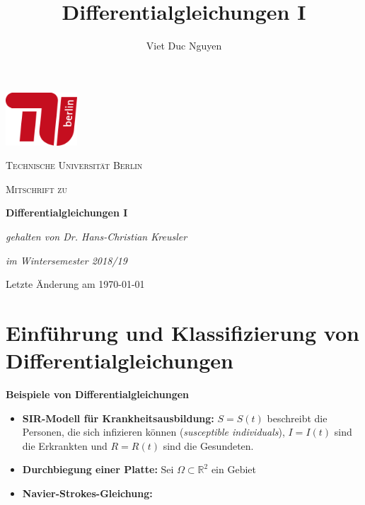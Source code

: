 \documentclass[a4paper]{book}
\theoremstyle{plain}
\theoremstyle{definition}
\begin{document}
\title{Differentialgleichungen I}
\author{Viet Duc Nguyen}


\begin{titlepage}
	\centering
	\includegraphics[width=0.2\textwidth]{tub_logo.png}\par\vspace{1cm}
	{\scshape\LARGE Technische Universit\"at Berlin \par}
	\vspace{1cm}
	{\scshape\Large Mitschrift zu \par}
	\vspace{1.5cm}
	{\Huge\bfseries Differentialgleichungen I \par}
	\vspace{2cm}
	{\Large\itshape gehalten von Dr. Hans-Christian Kreusler \par}
	{\Large\itshape im Wintersemester 2018/19\par}
	\vfill
	
	{\large Letzte \"Anderung am \today \par}
\end{titlepage}



\tableofcontents

\setcounter{chapter}{-1}
\chapter[Einführung und Klassifizierung]{Einführung und Klassifizierung von Differentialgleichungen}
\textbf{Beispiele von Differentialgleichungen}
\begin{itemize}
	\item \textbf{SIR-Modell für Krankheitsausbildung:} $S=S(t)$ beschreibt die Personen, die sich infizieren können (\textit{susceptible individuals}), $I=I(t)$ sind die Erkrankten und $R=R(t)$ sind die Gesundeten.
	
	\item\textbf{Durchbiegung einer Platte:} Sei $\Omega \subset \mathbb R^2$ ein Gebiet
	
	\item\textbf{Navier-Strokes-Gleichung:}
	
\end{itemize}
\end{document}
